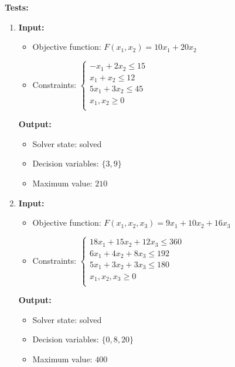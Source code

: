 \documentclass{article}
\begin{document}
\textbf{Tests:}
\begin{enumerate}[label={(\arabic*)}]
    \item \textbf{Input:}
          \begin{itemize}
              \item Objective function: \(F(x_1, x_2) = 10 x_1 + 20 x_2\)
              \item Constraints: \(\begin{cases}
                        -x_1 + 2 x_2 \le 15  \\
                        x_1 + x_2 \le 12     \\
                        5 x_1 + 3 x_2 \le 45 \\
                        x_1, x_2 \ge 0       \\
                    \end{cases}\)
          \end{itemize}

          \textbf{Output:}
          \begin{itemize}
              \item Solver state: solved
              \item Decision variables: \({\{ 3, 9 \}}\)
              \item Maximum value: \(210\)
          \end{itemize}

          \newpage

    \item \textbf{Input:}
          \begin{itemize}
              \item Objective function: \(F(x_1, x_2, x_3) = 9 x_1 + 10 x_2 + 16 x_3\)
              \item Constraints: \(\begin{cases}
                        18 x_1 + 15 x_2 + 12 x_3 \le 360 \\
                        6 x_1 + 4 x_2 + 8 x_3 \le 192    \\
                        5 x_1 + 3 x_2 + 3 x_3 \le 180    \\
                        x_1, x_2, x_3 \ge 0              \\
                    \end{cases}\)
          \end{itemize}

          \textbf{Output:}
          \begin{itemize}
              \item Solver state: solved
              \item Decision variables: \({\{ 0, 8, 20 \}}\)
              \item Maximum value: \(400\)
          \end{itemize}


\end{enumerate}
\end{document}
